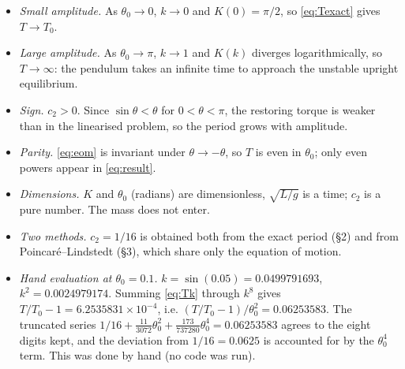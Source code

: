 \documentclass{article}
\begin{document}
\begin{itemize}
  \item \emph{Small amplitude.} As $\theta_0 \to 0$, $k \to 0$ and
    $K(0) = \pi/2$, so \eqref{eq:Texact} gives $T \to T_0$.
  \item \emph{Large amplitude.} As $\theta_0 \to \pi$, $k \to 1$ and $K(k)$
    diverges logarithmically, so $T \to \infty$: the pendulum takes an
    infinite time to approach the unstable upright equilibrium.
  \item \emph{Sign.} $c_2 > 0$. Since $\sin\theta < \theta$ for
    $0<\theta<\pi$, the restoring torque is weaker than in the linearised
    problem, so the period grows with amplitude.
  \item \emph{Parity.} \eqref{eq:eom} is invariant under
    $\theta\to-\theta$, so $T$ is even in $\theta_0$; only even powers
    appear in \eqref{eq:result}.
  \item \emph{Dimensions.} $K$ and $\theta_0$ (radians) are dimensionless,
    $\sqrt{L/g}$ is a time; $c_2$ is a pure number. The mass does not enter.
  \item \emph{Two methods.} $c_2 = 1/16$ is obtained both from the exact
    period (\S2) and from Poincar\'e--Lindstedt (\S3), which share only the
    equation of motion.
  \item \emph{Hand evaluation at $\theta_0 = 0.1$.} $k = \sin(0.05) =
    0.0499791693$, $k^2 = 0.0024979174$. Summing \eqref{eq:Tk} through
    $k^8$ gives $T/T_0 - 1 = 6.2535831\times10^{-4}$, i.e.
    $(T/T_0 - 1)/\theta_0^2 = 0.06253583$. The truncated series
    $1/16 + \tfrac{11}{3072}\theta_0^2 + \tfrac{173}{737280}\theta_0^4 =
    0.06253583$ agrees to the eight digits kept, and the deviation from
    $1/16 = 0.0625$ is accounted for by the $\theta_0^4$ term. This was
    done by hand (no code was run).
\end{itemize}
\end{document}
